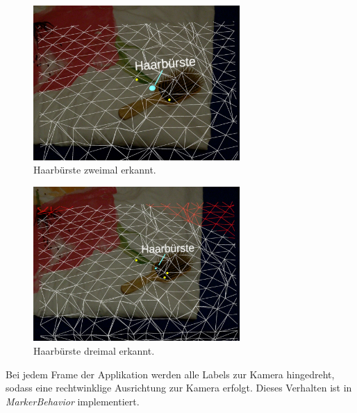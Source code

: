 
\begin{figure}[H]
	\centering
	\includegraphics[width=0.7\textwidth]{images/ML_multi1.jpg}
	\caption[Haarbürste zwei mal erkannt]{Haarbürste zweimal erkannt.}
	\label{image:multi1}
\end{figure}


\begin{figure}[H]
	\centering
	\includegraphics[width=0.7\textwidth]{images/ML_multi2.jpg}
	\caption[Haarbürste drei mal erkannt]{Haarbürste dreimal erkannt.}
	\label{image:multi2}
\end{figure}


Bei jedem Frame der Applikation werden alle Labels zur Kamera hingedreht, sodass eine rechtwinklige Ausrichtung zur Kamera erfolgt. Dieses Verhalten ist in \textit{MarkerBehavior} implementiert. 

